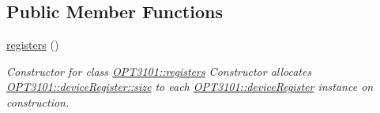 \subsection*{Public Member Functions}
\begin{DoxyCompactItemize}
\item 
\mbox{\hyperlink{class_o_p_t3101_1_1registers_ad17b048a9eb5a74b3fef29fb145a9e92}{registers}} ()
\begin{DoxyCompactList}\small\item\em Constructor for class \mbox{\hyperlink{class_o_p_t3101_1_1registers}{O\+P\+T3101\+::registers}} Constructor allocates \mbox{\hyperlink{class_o_p_t3101_1_1device_register_a058d48b4c23e22739b1c65d85367a0a8}{O\+P\+T3101\+::device\+Register\+::size}} to each \mbox{\hyperlink{class_o_p_t3101_1_1device_register}{O\+P\+T3101\+::device\+Register}} instance on construction. \end{DoxyCompactList}\end{DoxyCompactItemize}
